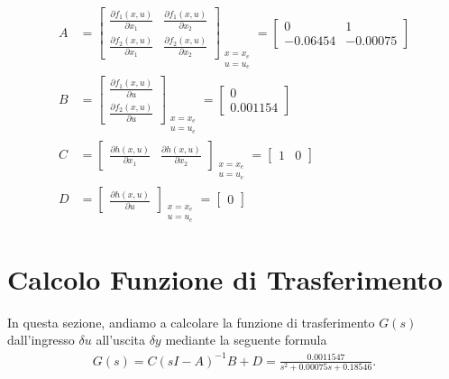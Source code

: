 \documentclass[a4paper, 11pt]{article}
\begin{document}
\begin{subequations}\label{eq:matrices}
\begin{align}
	A &= \begin{bmatrix}
		\frac{\partial f_1(x,u)}{\partial x_1} & \frac{\partial f_1(x,u)}{\partial x_2}
		\\
		\frac{\partial f_2(x,u)}{\partial x_1} & \frac{\partial f_2(x,u)}{\partial x_2}
	\end{bmatrix}_{\substack{x = x_e\\u = u_e}} = \begin{bmatrix}
		  0 & 1
		\\
		-0.06454 & -0.00075
	\end{bmatrix}
	\\
	B &= \begin{bmatrix}
		\frac{\partial f_1(x,u)}{\partial u}
		\\
		\frac{\partial f_2(x,u)}{\partial u}
	\end{bmatrix}_{\substack{x = x_e\\u = u_e}} = \begin{bmatrix}
	       0 \\ 0.001154
	\end{bmatrix}
	\\
	C &= \begin{bmatrix}
		\frac{\partial h(x,u)}{\partial x_1}
		&
		\frac{\partial h(x,u)}{\partial x_2}
	\end{bmatrix}_{\substack{x = x_e\\u = u_e}} = \begin{bmatrix}
	    1 & 0
	\end{bmatrix}
	\\
	D &= \begin{bmatrix}
		\frac{\partial h(x,u)}{\partial u}
	\end{bmatrix}_{\substack{x = x_e\\u = u_e}} = \begin{bmatrix}
	    0
	\end{bmatrix}
\end{align}
\end{subequations}
%
\section{Calcolo Funzione di Trasferimento}

In questa sezione, andiamo a calcolare la funzione di trasferimento $G(s)$ dall'ingresso $\delta u$ all'uscita $\delta y$ mediante la seguente formula 
%
%
\begin{align}\label{eq:transfer_function}
G(s) = C(sI -A)^{-1} B+D = \frac{0.0011547}{s^2+0.00075s+0.18546}.
\end{align}
\end{document}
